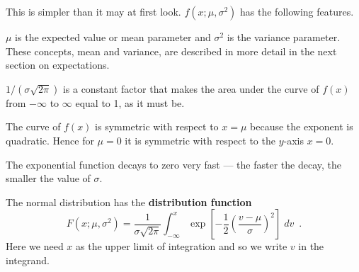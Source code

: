 This is simpler than it may at first look. $f(x;\mu, \sigma^2)$ has the following features.
\bit
\item $\mu$ is the expected value or mean parameter and $\sigma^2$ is the variance parameter. These concepts, mean and variance, are described in more detail in the next section on expectations.
\item $1/(\sigma\sqrt{2\pi})$ is a constant factor that makes the area under the curve of $f(x)$ from $-\infty$ to $\infty$ equal to 1, as it must be.
\item The curve of $f(x)$ is symmetric with respect to $x=\mu$ because the exponent is quadratic. Hence for $\mu=0$ it is symmetric with respect to the $y$-axis $x=0$.
\item The exponential function decays to zero very fast --- the faster the decay, the smaller the value of $\sigma$.
\eit


\begin{framed}
The normal distribution has the {\bf distribution function}
\begin{equation}\label{eqn:norm_int_cdf}F(x; \mu, \sigma^2)=\frac{1}{\sigma\sqrt{2\pi}}\int_{-\infty}^x\exp\left[-\frac{1}{2}\left(\frac{v-\mu}{\sigma}\right)^2\right]\;dv\enspace.\end{equation}
Here we need $x$ as the upper limit of integration and so we write $v$ in the integrand.
\end{framed}


\begin{figure}[ht]
\end{figure}

